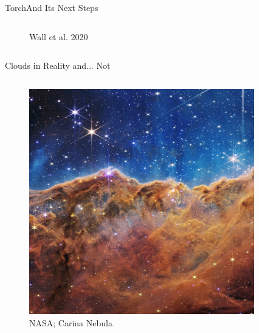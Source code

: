 \documentclass[aspectratio=169]{beamer}
\begin{document}
\begin{frame}{Torch}{And Its Next Steps}
\begin{columns}
\begin{column}{0.4\textwidth}
\begin{figure}[h!]
                Wall et al. 2020
                \label{fig:torch}
            \end{figure}
        \end{column}
    \end{columns}
\end{frame} 
%
%
%
%
%
\begin{frame}{Clouds in Reality and... Not}{}
    \begin{columns}
        \begin{column}{0.35\textwidth}
            \begin{figure}[h!]
                \centering
                \includegraphics[width=\linewidth]{../images/jwst.jpg} \\
                NASA; Carina Nebula
                \label{fig:jwst}
            \end{figure}
        \end{column}
        \begin{column}{0.35\textwidth}
            \begin{figure}[h!]
                \centering

\end{figure}
\end{column}
\end{columns}
\end{frame}
\end{document}

